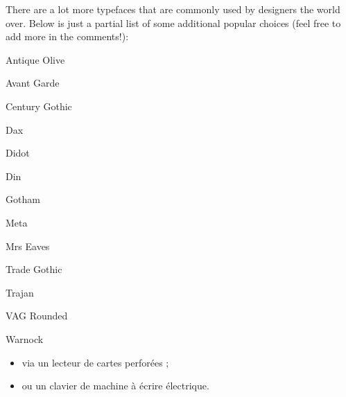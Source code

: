 \documentclass[12pt,a4paper,twocolumn]{book} %
\begin{document}
There are a lot more typefaces that are commonly used by designers the world over. Below is just a partial list of some additional popular choices (feel free to add more in the comments!):

Antique Olive

 

Avant Garde

 

Century Gothic

 

Dax

 

Didot

 

Din

 

Gotham

 

Meta

 

Mrs Eaves

 

Trade Gothic

 

Trajan

 

VAG Rounded

 

Warnock





\begin{itemize}
\item  via un lecteur de cartes perforées ;
\item  ou un clavier de machine à écrire électrique.
\end{itemize}
\end{document}
